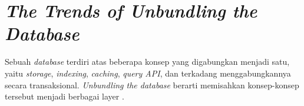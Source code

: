 \section{\textit{The Trends of Unbundling the Database}}

Sebuah \textit{database} terdiri atas beberapa konsep yang digabungkan menjadi satu, yaitu \textit{storage}, \textit{indexing}, \textit{caching}, \textit{query API}, dan terkadang menggabungkannya secara transaksional. \textit{Unbundling the database} berarti memisahkan konsep-konsep tersebut menjadi berbagai layer \parencite{leverageDatabaseInsideOut}.



